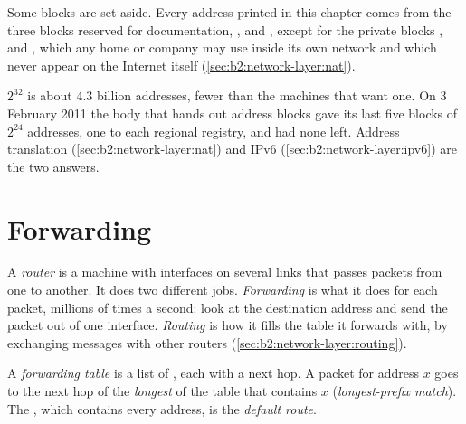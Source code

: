 Some blocks are set aside. Every address printed in this chapter comes from the three blocks reserved for
documentation, ,  and , except for the private
blocks ,  and , which any home or company may use inside
its own network and which never appear on the Internet itself (\cref{sec:b2:network-layer:nat}).

\begin{history}
$2^{32}$ is about 4.3 billion addresses, fewer than the machines that want one. On 3 February 2011 the body that
hands out address blocks gave its last five blocks of $2^{24}$ addresses, one to each regional registry, and had none
left. Address translation (\cref{sec:b2:network-layer:nat}) and IPv6 (\cref{sec:b2:network-layer:ipv6}) are the two
answers.
\end{history}

\section{Forwarding}\label{sec:b2:network-layer:forwarding}

\begin{definition}\label{def:b2:network-layer:routing}
A \emph{router} is a machine with interfaces on several links that passes packets from one to another. It
does two different jobs. \emph{Forwarding} is what it does for each packet, millions of times a
second: look at the destination address and send the packet out of one interface. \emph{Routing} is how
it fills the table it forwards with, by exchanging messages with other routers (\cref{sec:b2:network-layer:routing}).
\end{definition}

\begin{definition}\label{def:b2:network-layer:lpm}
A \emph{forwarding table} is a list of , each with a next hop. A packet for address
$x$ goes to the next hop of the \emph{longest}  of the table that contains $x$
(\emph{longest-prefix match}). The  , which contains every
address, is the \emph{default route}.
\end{definition}

